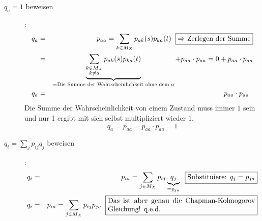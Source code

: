 \begin{uebsp}
\begin{Answer}
\begin{description}
    \item [$q_a=1$ beweisen]:
        \begin{eqnarray*}
            q_a &=& p_{aa}=\sum_{k\in M_X}p_{ak}(s)p_{ka}(t)\;\;\fbox{$\Rightarrow$ Zerlegen der Summe}\\
                &=& \underbrace{\sum_{\substack{k\in M_X\\k\neq a}}p_{ak}(s)p_{ka}(t)}_{=\text{Die Summe der Wahrscheinlichkeit ohne dem } a}+p_{aa}\cdot p_{aa}=0+p_{aa}\cdot p_{aa}\\
            q_a &=& p_{aa}\cdot p_{aa}\;\;
        \end{eqnarray*}
        Die Summe der Wahrscheinlichkeit von einem Zustand muss immer $1$ sein und nur 1 ergibt mit sich selbst multipliziert wieder $1$.
        \[q_a = p_{aa} = p_{aa}\cdot p_{aa} = 1\]
    \item [$q_i=\sum_jp_{ij}q_j$ beweisen]:
        \begin{eqnarray*}
            q_i &=& p_{ia} = \sum_{j\in M_X} p_{ij}\underbrace{q_j}_{=p_{ja}}\;\;\fbox{Substituiere: $q_j=p_{ja}$}\\
            q_i &=& p_{ia} = \sum_{j\in M_X} p_{ij}p_{ja}\;\;\fbox{\parbox{0.6\linewidth}{Das ist aber genau die Chapman-Kolmogorov Gleichung! q.e.d.}}
        \end{eqnarray*}
\end{description}

\end{Answer}
\end{uebsp}
